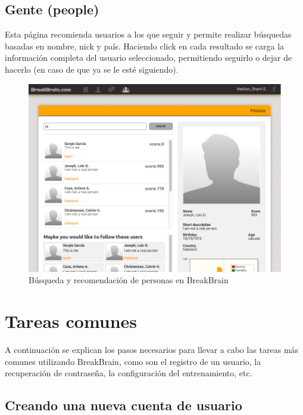 \subsection{Gente (people)}

Esta página recomienda usuarios a los que seguir y permite realizar búsquedas basadas en nombre, nick y país. Haciendo click en cada resultado se carga la información completa del usuario seleccionado, permitiendo seguirlo o dejar de hacerlo (en caso de que ya se le esté siguiendo).

\begin{figure}[h]
  \begin{center}
    \includegraphics[width=\textwidth]{./images/page-people.png}
  \end{center}  
  \caption{Búsqueda y recomendación de personas en BreakBrain}
  \label{fig::page-people}
\end{figure}

\section{Tareas comunes}

A continuación se explican los pasos necesarios para llevar a cabo las tareas más comunes utilizando BreakBrain, como son el registro de un usuario, la recuperación de contraseña, la configuración del entrenamiento, etc.

\subsection{Creando una nueva cuenta de usuario}

